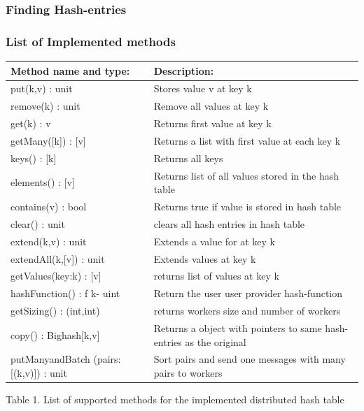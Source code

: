 \subsubsection{Finding Hash-entries}
\subsubsection{List of Implemented methods}
\begin{center}
    \begin{tabular}{ | p{4cm} | p{10cm} |}
    \hline
    Method name and type: & Description: \\ \hline
    put(k,v) : unit & Stores value v at key k \\ \hline
    remove(k) : unit & Remove all values at key k \\ \hline
    get(k) : v & Returns first value at key k \\ \hline
    getMany([k]) : [v] & Returns a list with first value at each key k \\\hline
    keys() : [k] & Returns all keys \\ \hline
    elements() : [v] & Returns list of all values stored in the hash table \\ \hline
    contains(v) : bool & Returns true if value is stored in hash table \\ \hline
    clear() : unit & clears all hash entries in hash table \\ \hline
    extend(k,v) : unit & Extends a value for at key k \\ \hline
    extendAll(k,[v]) : unit & Extends values at key k \\ \hline
    getValues(key:k) : [v] & returns list of values at key k \\ \hline
    hashFunction() : f k-\> uint & Return the user user provider hash-function \\ \hline
     getSizing() : (int,int) & returns workers size and number of workers \\ \hline
     copy() : Bighash[k,v] & Returns a object with pointers to same hash-entries as the original\\ \hline
    putManyandBatch       (pairs:[(k,v)]) : unit & Sort pairs and send one messages with many pairs to workers \\ \hline
    \end{tabular}
\end{center}
\begin{center} Table 1. List of supported methods for the implemented distributed hash table \end{center}


